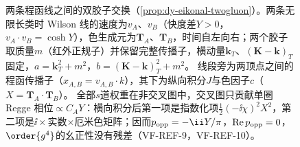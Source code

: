 \begin{figure}[htbp]
\caption{两条程函线之间的双胶子交换（\cref{prop:dy-eikonal-twogluon}）。两条无限长类时 Wilson 线的速度为$v_A$、$v_B$（快度差$Y>0$，$v_A\cdot v_B=\cosh Y$），色生成元为$\mathbf T_A$、$\mathbf T_B$，时间自左向右；两个胶子取质量$m$（红外正规子）并保留完整传播子，横动量$\mathbf k_T$、$(\mathbf K-\mathbf k)_T$固定，$a=\mathbf k_T^2+m^2$，$b=(\mathbf K-\mathbf k)_T^2+m^2$。
线段旁为两顶点之间的程函传播子（$x_{A,B}=v_{A,B}\cdot k$），其下为纵向积分$J$与色因子$c$（$X=\mathbf T_A\cdot\mathbf T_B$）。
全部$s$道权重在非交叉图中，交叉图只贡献单圈 Regge 相位$\propto C_AY$：横向积分后第一项是指数化项$\frac12(-\ii\chi)^2X^2$，第二项是$\ii\times$实数$\times$厄米色矩阵；因而$p_{\rm opp}=-\ii Y/\pi$，${\rm Re}\,p_{\rm opp}=0$，$\order{g^4}$的幺正性没有残差（VF-REF-9，VF-REF-10）。}
\label{fig:dy-two-gluon-exchange}
\end{figure}

